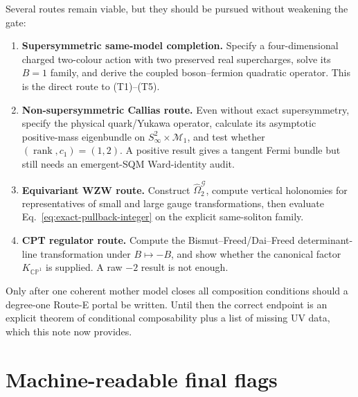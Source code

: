 \documentclass[11pt]{article}
\theoremstyle{definition}
\theoremstyle{remark}
\newcommand{\CP}{\mathbb {CP}}
\newcommand{\cM}{\mathcal M}
\newcommand{\cG}{\mathcal G}
\begin{document}
Several routes remain viable, but they should be pursued without weakening
the gate:
\begin{enumerate}
\item \textbf{Supersymmetric same-model completion.}  Specify a
  four-dimensional charged two-colour action with two preserved real
  supercharges, solve its \(B=1\) family, and derive the coupled boson--fermion
  quadratic operator.  This is the direct route to (T1)--(T5).
\item \textbf{Non-supersymmetric Callias route.}  Even without exact
  supersymmetry, specify the physical quark/Yukawa operator, calculate its
  asymptotic positive-mass eigenbundle on
  \(S^2_\infty\times\cM_1\), and test whether
  \((\operatorname{rank},c_1)=(1,2)\).  A positive result gives a tangent
  Fermi bundle but still needs an emergent-SQM Ward-identity audit.
\item \textbf{Equivariant WZW route.}  Construct
  \(\widehat\Omega_2^{\cG}\), compute vertical holonomies for representatives
  of small and large gauge transformations, then evaluate
  Eq.~\eqref{eq:exact-pullback-integer} on the explicit same-soliton family.
\item \textbf{CPT regulator route.}  Compute the Bismut--Freed/Dai--Freed
  determinant-line transformation under \(B\mapsto-B\), and show whether the
  canonical factor \(K_{\CP^1}\) is supplied.  A raw \(-2\) result is not
  enough.
\end{enumerate}
Only after one coherent mother model closes all composition conditions should
a degree-one Route-E portal be written.  Until then the correct endpoint is
an explicit theorem of conditional composability plus a list of missing UV
data, which this note now provides.

\section{Machine-readable final flags}
\end{document}

